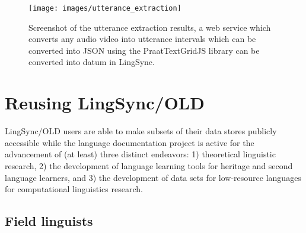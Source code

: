 \documentclass[11pt]{article}
\newcommand{\smalltodo}[2][]
    {\todo[caption={#2}, #1]
    {\tiny#2\normalsize}}
\begin{document}
\begin{figure}
\begin{center}
\texttt{[image: images/utterance\_extraction]}
\caption{Screenshot of the utterance extraction results, a web service which converts any audio video into utterance intervals which can be converted into JSON using the PraatTextGridJS library can be converted into datum in LingSync.}
\label{utterance_extraction_screenshot}
\end{center}
\end{figure}


\section{Reusing LingSync/OLD}
\label{open-data}




LingSync/OLD users are able to make subsets of their data stores publicly
accessible while the language documentation project is active for the advancement of (at least) three distinct endeavors: 1)
theoretical linguistic research, 2) the development of language learning tools for
heritage and second language learners, and 3) the development of data sets for low-resource languages for computational linguistics research. 



\subsection{Field linguists}
\end{document}
